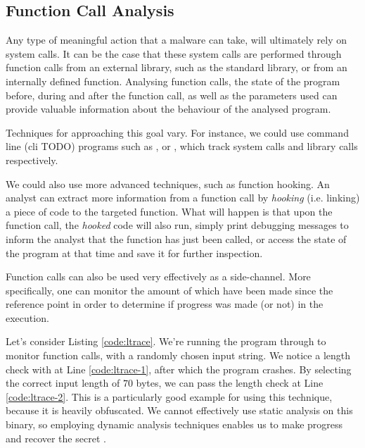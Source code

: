 \subsection{Function Call Analysis}


Any type of meaningful action that a malware can take, will ultimately rely on system calls. It can be the case that these system calls are performed through function calls from an external library, such as the standard  library, or from an internally defined function. Analysing function calls, the state of the program before, during and after the function call, as well as the parameters used can provide valuable information about the behaviour of the analysed program. 

Techniques for approaching this goal vary. For instance, we could use command line (cli TODO) programs such as , or , which track system calls and library calls respectively. 

We could also use more advanced techniques, such as function hooking. An analyst can extract more information from a function call by \emph{hooking} (i.e. linking) a piece of code to the targeted function. What will happen is that upon the function call, the \emph{hooked} code will also run, simply print debugging messages to inform the analyst that the function has just been called, or access the state of the program at that time and save it for further inspection. \cite{da_survey_2019}

Function calls can also be used very effectively as a side-channel. More specifically, one can monitor the amount of  which have been made since the reference point in order to determine if progress was made (or not) in the execution. 

Let's consider Listing \ref{code:ltrace}. We're running the  program through  to monitor function calls, with a randomly chosen input string. We notice a length check with  at Line \ref{code:ltrace-1}, after which the program crashes. By selecting the correct input length of $70$ bytes, we can pass the length check at Line \ref{code:ltrace-2}. This  is a particularly good example for using this technique, because it is heavily obfuscated. We cannot effectively use static analysis on this binary, so employing dynamic analysis techniques enables us to make progress and recover the secret \cite{crusu_relabs}.

